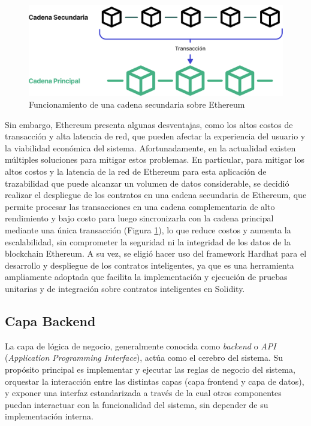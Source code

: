 \begin{figure}[!htb]
    \centering
    \includegraphics[width=0.9\linewidth]{Figures/blockchain-layer-2.png}
    \caption{Funcionamiento de una cadena secundaria sobre Ethereum}
    \label{fig:ethereum-layer-2}
\end{figure}

Sin embargo, Ethereum presenta algunas desventajas, como los altos costos de transacción y alta latencia de red, que pueden afectar la experiencia del usuario y la viabilidad económica del sistema. Afortunadamente, en la actualidad existen múltiples soluciones para mitigar estos problemas. En particular, para mitigar los altos costos y la latencia de la red de Ethereum para esta aplicación de trazabilidad que puede alcanzar un volumen de datos considerable, se decidió realizar el despliegue de los contratos en una cadena secundaria de Ethereum, que permite procesar las transacciones en una cadena complementaria de alto rendimiento y bajo costo para luego sincronizarla con la cadena principal mediante una única transacción (Figura \ref{fig:ethereum-layer-2}), lo que reduce costos y aumenta la escalabilidad, sin comprometer la seguridad ni la integridad de los datos de la blockchain Ethereum. A su vez, se eligió hacer uso del framework Hardhat para el desarrollo y despliegue de los contratos inteligentes, ya que es una herramienta ampliamente adoptada que facilita la implementación y ejecución de pruebas unitarias y de integración sobre contratos inteligentes en Solidity.

\subsection{Capa Backend}

La capa de lógica de negocio, generalmente conocida como \textit{backend} o \textit{API} (\textit{Application Programming Interface}), actúa como el cerebro del sistema. Su propósito principal es implementar y ejecutar las reglas de negocio del sistema, orquestar la interacción entre las distintas capas (capa frontend y capa de datos), y exponer una interfaz estandarizada a través de la cual otros componentes puedan interactuar con la funcionalidad del sistema, sin depender de su implementación interna.

